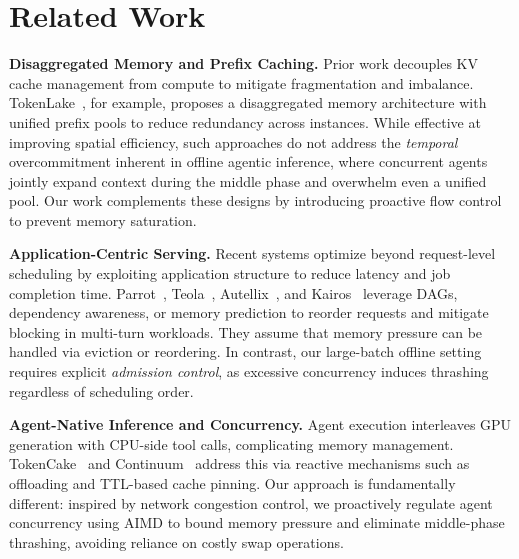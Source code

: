 \section{Related Work}
\textbf{Disaggregated Memory and Prefix Caching.}
Prior work decouples KV cache management from compute to mitigate fragmentation and imbalance. TokenLake~\cite{tokenlake}, for example, proposes a disaggregated memory architecture with unified prefix pools to reduce redundancy across instances. While effective at improving spatial efficiency, such approaches do not address the \emph{temporal} overcommitment inherent in offline agentic inference, where concurrent agents jointly expand context during the middle phase and overwhelm even a unified pool. Our work complements these designs by introducing proactive flow control to prevent memory saturation.

\textbf{Application-Centric Serving.}
Recent systems optimize beyond request-level scheduling by exploiting application structure to reduce latency and job completion time. Parrot~\cite{parrot}, Teola~\cite{teola}, Autellix~\cite{autellix}, and Kairos~\cite{kairos} leverage DAGs, dependency awareness, or memory prediction to reorder requests and mitigate blocking in multi-turn workloads. They assume that memory pressure can be handled via eviction or reordering. In contrast, our large-batch offline setting requires explicit \emph{admission control}, as excessive concurrency induces thrashing regardless of scheduling order.

\textbf{Agent-Native Inference and Concurrency.}
Agent execution interleaves GPU generation with CPU-side tool calls, complicating memory management. TokenCake~\cite{tokencake} and Continuum~\cite{continuum} address this via reactive mechanisms such as offloading and TTL-based cache pinning. Our approach is fundamentally different: inspired by network congestion control, we proactively regulate agent concurrency using AIMD to bound memory pressure and eliminate middle-phase thrashing, avoiding reliance on costly swap operations.